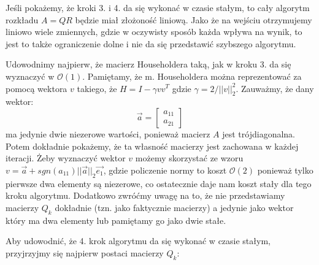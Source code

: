 \documentclass[a4paper]{article}
\begin{document}
Jeśli pokażemy, że kroki 3. i 4. da się wykonać w czasie stałym, to cały algorytm rozkładu $A=QR$ będzie miał złożoność liniową. Jako że na wejściu otrzymujemy liniowo wiele zmiennych, gdzie w oczywisty sposób każda wpływa na wynik, to jest to także ograniczenie dolne i nie da się przedstawić szybszego algorytmu.

Udowodnimy najpierw, że macierz Householdera taką, jak w kroku 3. da się wyznaczyć w $\mathcal{O}(1)$. Pamiętamy, że m. Householdera można reprezentować za pomocą wektora $v$ takiego, że $H=I- \gamma vv^T$ gdzie $\gamma = 2/ ||v||_{2}^{2}$. Zauważmy, że dany wektor: $$\vec{a}=\begin{bmatrix}
a_{11} \\
a_{21}
\end{bmatrix}$$ ma jedynie dwie niezerowe wartości, ponieważ macierz $A$ jest trójdiagonalna. Potem dokładnie pokażemy, że ta własność macierzy jest zachowana w każdej iteracji. Żeby wyznaczyć wektor $v$ możemy skorzystać ze wzoru $v=\vec{a} + sgn(a_{11})||\vec{a}||_2 \vec{e_1}$, gdzie policzenie normy to koszt $\mathcal{O}(2)$ ponieważ tylko pierwsze dwa elementy są niezerowe, co ostatecznie daje nam koszt stały dla tego kroku algorytmu. Dodatkowo zwróćmy uwagę na to, że nie przedstawiamy macierzy $Q_k$ dokładnie (tzn. jako faktycznie macierzy) a jedynie jako wektor który ma dwa elementy lub pamiętamy go jako dwie stałe.

Aby udowodnić, że 4. krok algorytmu da się wykonać w czasie stałym, przyjrzyjmy się najpierw postaci macierzy $Q_k$:
\end{document}
